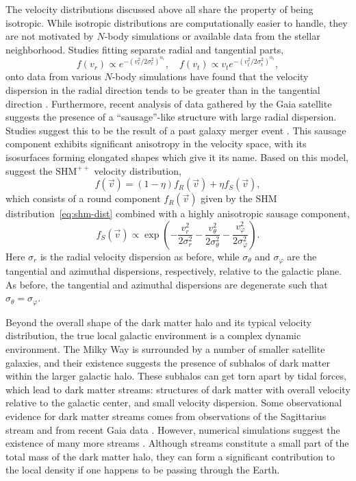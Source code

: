 The velocity distributions discussed above all share the property of being isotropic. While isotropic distributions are computationally easier to handle, they are not motivated by $N$-body simulations or available data from the stellar neighborhood. Studies fitting separate radial and tangential parts,
\begin{equation}
    f(v_r)\propto e^{-(v_r^2/2\sigma_r^2)^{\alpha_r}},\quad f(v_t)\propto v_te^{-(v_t^2/2\sigma_t^2)^{\alpha_t}},
\end{equation}
onto data from various $N$-body simulations have found that the velocity dispersion in the radial direction tends to be greater than in the tangential direction \parencites{FairbairnSchwetz2009, KuhlenEtAl2010}. Furthermore, recent analysis of data gathered by the Gaia satellite suggests the presence of a ``sausage''-like structure with large radial dispersion. Studies suggest this to be the result of a past galaxy merger event \parencites{BelokurovEtAl2018, KruijssenEtAl2018, HelmiEtAl2018}. This sausage component exhibits significant anisotropy in the velocity space, with its isosurfaces forming elongated shapes which give it its name. Based on this model, \textcite{EvansOHareMcCabe2019} suggest the $\text{SHM}^{++}$ velocity distribution,
\begin{equation}
    f(\vec{v})=(1-\eta)f_R(\vec{v})+\eta f_S(\vec{v}),
\end{equation}
which consists of a round component $f_R(\vec{v})$ given by the SHM distribution~\eqref{eq:shm-dist} combined with a highly anisotropic sausage component,
\begin{equation}
    f_S(\vec{v})\propto\exp\left(-\frac{v_r^2}{2\sigma_r^2}-\frac{v_\theta^2}{2\sigma_\theta^2}-\frac{v_\varphi^2}{2\sigma_\varphi^2}\right).
\end{equation}
Here $\sigma_r$ is the radial velocity dispersion as before, while $\sigma_\theta$ and $\sigma_\varphi$ are the tangential and azimuthal dispersions, respectively, relative to the galactic plane. As before, the tangential and azimuthal dispersions are degenerate such that $\sigma_\theta=\sigma_\varphi$.

Beyond the overall shape of the dark matter halo and its typical velocity distribution, the true local galactic environment is a complex dynamic environment. The Milky Way is surrounded by a number of smaller satellite galaxies, and their existence suggests the presence of subhalos of dark matter within the larger galactic halo. These subhalos can get torn apart by tidal forces, which lead to dark matter streams: structures of dark matter with overall velocity relative to the galactic center, and small velocity dispersion. Some observational evidence for dark matter streams comes from observations of the Sagittarius stream \parencite{BelokurovEtAl2013} and from recent Gaia data \parencite{NecibLisantiBelokurov2019}. However, numerical simulations suggest the existence of many more streams \parencite{HelmiWhiteSpringel2002}. Although streams constitute a small part of the total mass of the dark matter halo, they can form a significant contribution to the local density if one happens to be passing through the Earth.

